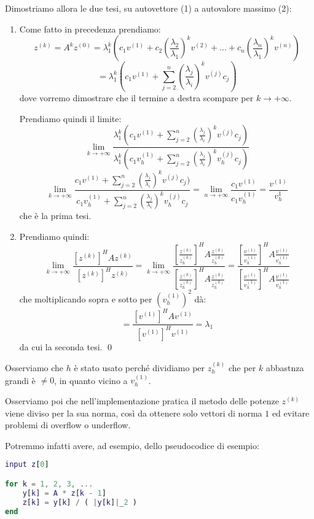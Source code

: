 \documentclass[a4paper,11pt]{article}
\begin{document}
Dimostriamo allora le due tesi, su autovettore (1) a autovalore massimo (2):
\begin{enumerate}
	\item 
Come fatto in precedenza prendiamo: 
$$
z^{(k)} = A^k z^{(0)} = \lambda_1^k \left( c_1 v^{(1)} + c_2 \left( \frac{\lambda_2}{\lambda_1} \right)^k v^{(2)} + ... + c_n \left( \frac{\lambda_n}{\lambda_1} \right)^k v^{(n)} \right)
$$
$$
= \lambda_1^k \left( c_1 v^{(1)} + \sum_{j = 2}^n \left(\frac{\lambda_j}{\lambda_i}\right)^k v^{(j)} c_j \right)
$$
dove vorremo dimostrare che il termine a destra scompare per $k \rightarrow +\infty$.

Prendiamo quindi il limite:
$$
\lim_{k \rightarrow +\infty} \frac{ \lambda_1^k \left( c_1 v^{(1)} + \sum_{j = 2}^n \left(\frac{\lambda_j}{\lambda_i}\right)^k v^{(j)} c_j \right) }{ \lambda_1^k \left( c_1 v^{(1)}_h + \sum_{j = 2}^n \left(\frac{\lambda_j}{\lambda_i}\right)^k v^{(j)}_h c_j \right) }
$$
$$
\lim_{k \rightarrow +\infty} \frac{ c_1 v^{(1)} + \sum_{j = 2}^n \left(\frac{\lambda_j}{\lambda_i}\right)^k v^{(j)} c_j ) }{ c_1 v^{(1)}_h + \sum_{j = 2}^n \left(\frac{\lambda_j}{\lambda_i}\right)^k v^{(j)}_h c_j }
= \lim_{n \rightarrow + \infty} \frac{c_1 v^{(1)}}{c_1 v_h^{(1)}} = \frac{v^{(1)}}{v_h^{1}}
$$
che è la prima tesi.

	\item
Prendiamo quindi:
$$
\lim_{k \rightarrow + \infty} \frac{\left[ z^{(k)} \right]^H A z^{(k)}}{\left[ z^{(k)} \right]^H z^{(k)}} 
= \lim_{k \rightarrow + \infty} \frac{ \left[ \frac{z^{(k)}}{z_h^{(k)}} \right]^H A \frac{z^{(k)}}{z_h^{(k)}} }{ \left[ \frac{z^{(k)}}{z^{(k)}_h} \right]^H A \frac{z^{(k)}}{z^{(k)}_h} }
= \frac{ \left[ \frac{v^{(1)}}{v_h^{(1)}} \right]^H A \frac{v^{(1)}}{v_h^{(1)}} }{ \left[ \frac{v^{(1)}}{v^{(1)}_h} \right]^H A \frac{v^{(1)}}{v^{(1)}_h} } 
$$
che moltiplicando sopra e sotto per $\left( v_h^{(1)} \right)^2$ dà:
$$
= \frac{ [v^{(1)} ]^H A v^{(1)} }{ [v^{(1)}]^H v^{(1)} } = \lambda_1
$$
da cui la seconda tesi. \qed
\end{enumerate}

Osserviamo che $h$ è stato usato perché dividiamo per $z_h^{(k)}$ che per $k$ abbastnza grandi è $\neq 0$, in quanto vicino a $v_h^{(1)}$.

Osserviamo poi che nell'implementazione pratica il metodo delle potenze $z^{(k)}$ viene diviso per la sua norma, così da ottenere solo vettori di norma $1$ ed evitare problemi di overflow o underflow.

Potremmo infatti avere, ad esempio, dello pseudocodice di esempio:
\begin{lstlisting}[language=MATLAB, style=codestyle]	
input z[0]

for k = 1, 2, 3, ...
	y[k] = A * z[k - 1]
	z[k] = y[k] / ( |y[k]|_2 )
end
\end{lstlisting}
\end{document}
